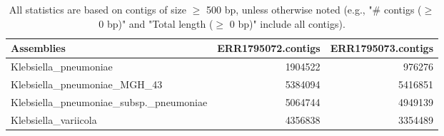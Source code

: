 \documentclass[12pt,a4paper]{article}
\begin{document}
\begin{table}[ht]
\begin{center}
\caption{All statistics are based on contigs of size $\geq$ 500 bp, unless otherwise noted (e.g., "\# contigs ($\geq$ 0 bp)" and "Total length ($\geq$ 0 bp)" include all contigs).}
\begin{tabular}{|l*{2}{|r}|}
\hline
Assemblies & ERR1795072.contigs & ERR1795073.contigs \\ \hline
Klebsiella\_pneumoniae & 1904522 & 976276 \\ \hline
Klebsiella\_pneumoniae\_MGH\_43 & 5384094 & 5416851 \\ \hline
Klebsiella\_pneumoniae\_subsp.\_pneumoniae & 5064744 & 4949139 \\ \hline
Klebsiella\_variicola & 4356838 & 3354489 \\ \hline
\end{tabular}
\end{center}
\end{table}
\end{document}
